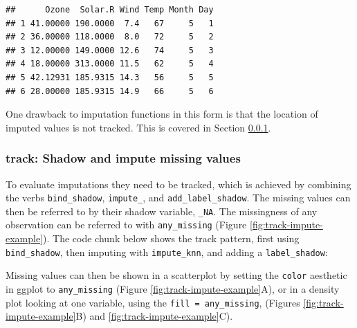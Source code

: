 \documentclass[]{article}
\newenvironment{Shaded}{\begin{snugshade}}{\end{snugshade}}
\newcommand{\KeywordTok}[1]{\textcolor[rgb]{0.13,0.29,0.53}{\textbf{#1}}}
\newcommand{\NormalTok}[1]{#1}
\newcommand{\OperatorTok}[1]{\textcolor[rgb]{0.81,0.36,0.00}{\textbf{#1}}}
\newcommand{\StringTok}[1]{\textcolor[rgb]{0.31,0.60,0.02}{#1}}
\theoremstyle{definition}
\theoremstyle{definition}
\theoremstyle{definition}
\theoremstyle{remark}
\begin{document}
\begin{verbatim}
##      Ozone  Solar.R Wind Temp Month Day
## 1 41.00000 190.0000  7.4   67     5   1
## 2 36.00000 118.0000  8.0   72     5   2
## 3 12.00000 149.0000 12.6   74     5   3
## 4 18.00000 313.0000 11.5   62     5   4
## 5 42.12931 185.9315 14.3   56     5   5
## 6 28.00000 185.9315 14.9   66     5   6
\end{verbatim}

One drawback to imputation functions in this form is that the location
of imputed values is not tracked. This is covered in Section
\ref{verbs-track}.

\hypertarget{verbs-track}{%
\subsubsection{track: Shadow and impute missing
values}\label{verbs-track}}

To evaluate imputations they need to be tracked, which is achieved by
combining the verbs \texttt{bind\_shadow}, \texttt{impute\_}, and
\texttt{add\_label\_shadow}. The missing values can then be referred to
by their shadow variable, \texttt{\_NA}. The missingness of any
observation can be referred to with \texttt{any\_missing} (Figure
\ref{fig:track-impute-example}). The code chunk below shows the track
pattern, first using \texttt{bind\_shadow}, then imputing with
\texttt{impute\_knn}, and adding a \texttt{label\_shadow}:

\begin{Shaded}
\end{Shaded}

Missing values can then be shown in a scatterplot by setting the
\texttt{color} aesthetic in ggplot to \texttt{any\_missing} (Figure
\ref{fig:track-impute-example}A), or in a density plot looking at one
variable, using the \texttt{fill\ =\ any\_missing}, (Figures
\ref{fig:track-impute-example}B) and \ref{fig:track-impute-example}C).
\end{document}

